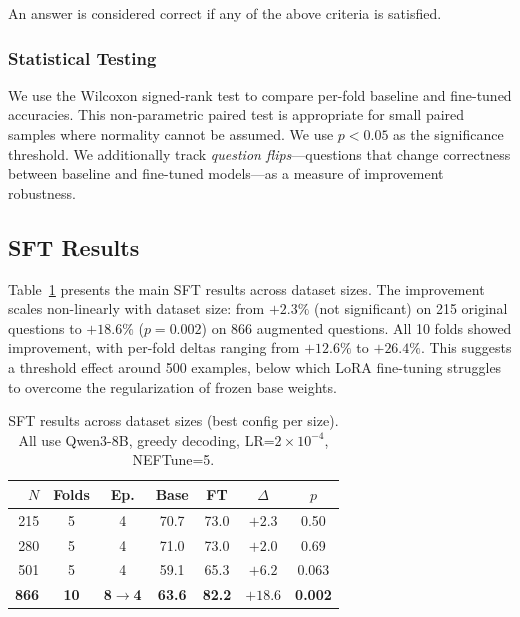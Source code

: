 An answer is considered correct if any of the above criteria is satisfied.

\subsubsection{Statistical Testing}

We use the Wilcoxon signed-rank test to compare per-fold baseline and fine-tuned accuracies. This non-parametric paired test is appropriate for small paired samples where normality cannot be assumed. We use $p < 0.05$ as the significance threshold. We additionally track \emph{question flips}---questions that change correctness between baseline and fine-tuned models---as a measure of improvement robustness.

\subsection{SFT Results}
\label{sec:sft:results}

Table~\ref{tab:sft_results} presents the main SFT results across dataset sizes. The improvement scales non-linearly with dataset size: from $+2.3\%$ (not significant) on 215 original questions to $+18.6\%$ ($p=0.002$) on 866 augmented questions. All 10 folds showed improvement, with per-fold deltas ranging from $+12.6\%$ to $+26.4\%$. This suggests a threshold effect around 500 examples, below which LoRA fine-tuning struggles to overcome the regularization of frozen base weights.

\begin{table}[t]
\centering
\small
\caption{SFT results across dataset sizes (best config per size). All use Qwen3-8B, greedy decoding, LR=$2\!\times\!10^{-4}$, NEFTune=5.}
\label{tab:sft_results}
\begin{tabular}{@{}rcccccc@{}}
\toprule
$N$ & Folds & Ep. & Base & FT & $\Delta$ & $p$ \\
\midrule
215 & 5 & 4          & 70.7 & 73.0 & $+2.3$  & 0.50 \\
280 & 5 & 4          & 71.0 & 73.0 & $+2.0$  & 0.69 \\
501 & 5 & 4          & 59.1 & 65.3 & $+6.2$  & 0.063 \\
\textbf{866} & \textbf{10} & \textbf{8$\to$4} & \textbf{63.6} & \textbf{82.2} & $\boldsymbol{+18.6}$ & \textbf{0.002} \\
\bottomrule
\end{tabular}
\end{table}


